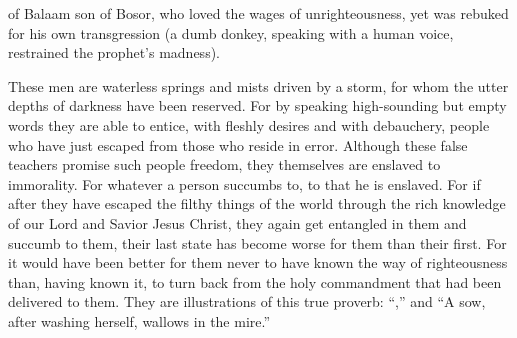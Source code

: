{of Balaam
son of Bosor,
who
loved
the wages
of unrighteousness,
yet
was
rebuked
for his own
transgression
(a dumb
donkey,
speaking
with
a human
voice,
restrained
the prophet’s
madness).
\par }{\PP {}These men
are
waterless
springs
and
mists
driven
by
a storm,
for whom
the utter depths
of darkness
have been reserved.
For
by speaking
high-sounding
but empty words
they are able to entice,
with
fleshly
desires
and with debauchery,
people who have just escaped
from those who reside
in
error.
Although these false teachers
promise
such people
freedom,
they themselves are
enslaved
to immorality.
For
whatever
a person
succumbs
to, to that
he is enslaved.
For
if
after
they have escaped
the filthy things
of the world
through
the rich knowledge
of our Lord
and
Savior
Jesus
Christ,
they
again
get entangled
in them
and
succumb
to them,
their last state
has become
worse
for them than their first.
For
it would have been
better
for them
never
to have known
the way
of righteousness
than,
having known
it, to turn back
from
the holy
commandment
that had been delivered
to them.
They
are illustrations
of this true
proverb: “{},” and
“A sow,
after washing
herself, wallows
in the mire.”

}
